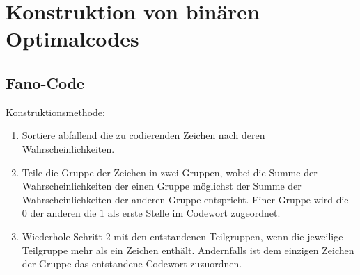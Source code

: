 
\section{Konstruktion von binären Optimalcodes}
\subsection{Fano-Code}
Konstruktionsmethode:
\begin{enumerate}
\item Sortiere abfallend die zu codierenden Zeichen nach deren Wahrscheinlichkeiten.
\item Teile die Gruppe der Zeichen in zwei Gruppen, wobei die Summe der Wahrscheinlichkeiten der einen Gruppe möglichst der Summe der Wahrscheinlichkeiten der anderen Gruppe entspricht. Einer Gruppe wird die $0$ der anderen die $1$ als erste Stelle im Codewort zugeordnet.
\item Wiederhole Schritt 2 mit den entstandenen Teilgruppen, wenn die jeweilige Teilgruppe mehr als ein Zeichen enthält. Andernfalls ist dem einzigen Zeichen der Gruppe das entstandene Codewort zuzuordnen.
\end{enumerate}

